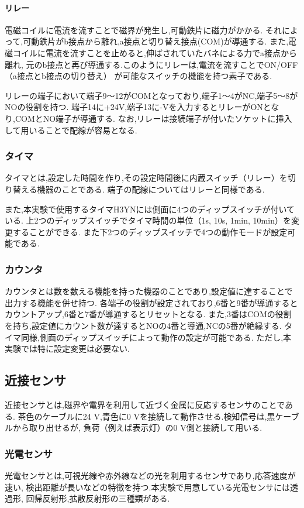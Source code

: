 \paragraph{リレー}
電磁コイルに電流を流すことで磁界が発生し,可動鉄片に磁力がかかる.
それによって,可動鉄片がb接点から離れ,a接点と切り替え接点(COM)が導通する.
また,電磁コイルに電流を流すことを止めると,伸ばされていたバネによる力でa接点から離れ,
元のb接点と再び導通する.このようにリレーは,電流を流すことでON/OFF（a接点とb接点の切り替え）
が可能なスイッチの機能を持つ素子である.

リレーの端子において端子9〜12がCOMとなっており,端子1〜4がNC,端子5〜8がNOの役割を持つ.
端子14に+24V,端子13に-Vを入力するとリレーがONとなり,COMとNO端子が導通する.
なお,リレーは接続端子が付いたソケットに挿入して用いることで配線が容易となる.

\subsubsection{タイマ}
タイマとは,設定した時間を作り,その設定時間後に内蔵スイッチ（リレー）を切り替える機器のことである.
端子の配線についてはリレーと同様である.

また,本実験で使用するタイマH3YNには側面に4つのディップスイッチが付いている.
上2つのディップスイッチでタイマ時間の単位（1s, 10s, 1min, 10min）を変更することができる.
また下2つのディップスイッチで4つの動作モードが設定可能である.

\subsubsection{カウンタ}
カウンタとは数を数える機能を持った機器のことであり,設定値に達することで出力する機能を併せ持つ.
各端子の役割が設定されており,6番と9番が導通するとカウントアップ,6番と7番が導通するとリセットとなる.
また,3番はCOMの役割を持ち,設定値にカウント数が達するとNOの4番と導通,NCの5番が絶縁する.
タイマ同様,側面のディップスイッチによって動作の設定が可能である.
ただし,本実験では特に設定変更は必要ない.

\subsection{近接センサ}
近接センサとは,磁界や電界を利用して近づく金属に反応するセンサのことである.
茶色のケーブルに24 V,青色に0 Vを接続して動作させる.検知信号は,黒ケーブルから取り出せるが,
負荷（例えば表示灯）の0 V側と接続して用いる.

\subsubsection{光電センサ}
光電センサとは,可視光線や赤外線などの光を利用するセンサであり,応答速度が速い,
検出距離が長いなどの特徴を持つ.本実験で用意している光電センサには透過形,
回帰反射形,拡散反射形の三種類がある.

